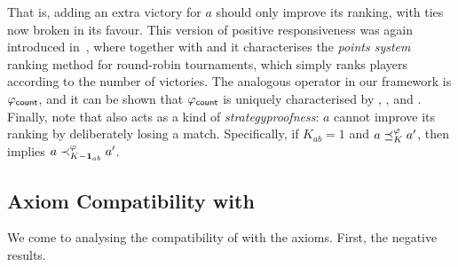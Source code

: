 That is, adding an extra victory for $a$ should only improve its ranking, with
ties now broken in its favour. This version of positive responsiveness was
again introduced in~\cite{rubinstein1980ranking}, where together with
 and  it characterises the \emph{points system}
ranking method for round-robin tournaments, which simply ranks players
according to the number of victories. The analogous operator in our framework
is ${\varphi_{\mathsf{count}}}$, and it can be shown that ${\varphi_{\mathsf{count}}}$ is uniquely characterised
by , ,  and .
%
Finally, note that  also acts as a kind of
\emph{strategyproofness}: $a$ cannot improve its ranking by deliberately losing
a match. Specifically, if $K_{ab} = 1$ and $a \preceq_K^\varphi a'$, then
 implies $a \prec_{K - \bm{1}_{ab}}^\varphi a'$.

\subsection{Axiom Compatibility with }


We come to analysing the compatibility of  with the axioms.
First, the negative results.

